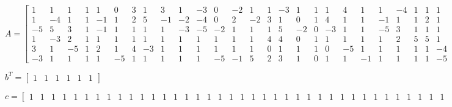 \documentclass[8pt]{article}
\begin{document}
\tiny
$ A =
\begin{bmatrix}
  1  &  1  &  1  &  1  &  1  &  0  &  3  &  1  &  3  &  1  & -3  &  0  & -2  &  1  &  1  & -3  &  1  &  1  &  1  &  4  &  1  &  1  & -4  &  1  &  1  &  1  & -2  &  4  &  1  &  4  & -5  & -3  & -2  &  1  &  1  &  1  &  1  &  1  &  1  &  1  &  1  & -4  &  1  &  1  & -1  &  1  &  1  & -5  &  1  & -3 \\
  1  & -4  &  1  &  1  & -1  &  1  &  2  &  5  & -1  & -2  & -4  &  0  &  2  & -2  &  3  &  1  &  0  &  1  &  4  &  1  &  1  & -1  &  1  &  1  &  2  &  1  &  1  & -5  &  1  &  2  &  1  & -2  &  2  &  1  &  1  &  3  & -2  &  1  &  1  & -3  &  1  & -3  &  1  &  1  & -2  &  1  &  1  &  4  &  1  &  1 \\
 -5  &  5  &  3  &  1  & -1  &  1  &  1  &  1  &  1  & -3  & -5  & -2  &  1  &  1  &  1  &  5  & -2  &  0  & -3  &  1  &  1  & -5  &  3  &  1  &  1  &  1  & -2  &  1  &  5  &  1  & -5  &  1  & -3  & -1  &  1  &  5  & -4  &  1  & -2  &  2  &  1  &  1  &  1  &  1  &  1  &  1  &  1  &  4  & -3  &  5 \\
  1  & -3  &  2  &  1  &  1  &  1  &  1  &  1  &  1  &  1  &  1  &  1  &  1  &  1  &  4  &  4  &  0  &  1  &  1  &  1  &  1  &  1  &  2  &  5  &  5  &  1  & -2  &  1  &  1  & -5  &  3  &  1  &  2  & -4  &  1  &  1  & -1  & -2  &  1  &  1  &  1  &  1  &  1  &  1  & -1  &  1  &  1  &  1  & -4  & -5 \\
  3  &  1  & -5  &  1  &  2  &  1  &  4  & -3  &  1  &  1  &  1  &  1  &  1  &  1  &  0  &  1  &  1  &  1  &  0  & -5  &  1  &  1  &  1  &  1  &  1  & -4  &  5  & -3  & -2  &  2  & -4  &  1  & -1  & -3  &  1  & -4  &  5  &  1  &  1  &  1  &  1  &  1  &  1  &  1  &  1  & -1  &  1  &  1  &  0  &  1 \\
 -3  &  1  &  1  &  1  &  1  & -5  &  1  &  1  &  1  &  1  &  1  & -5  & -1  &  5  &  2  &  3  &  1  &  0  &  1  &  1  & -1  &  1  &  1  &  1  &  1  & -5  & -4  & -2  &  1  & -2  & -5  &  0  & -5  & -3  & -5  &  1  &  2  &  1  &  0  & -4  &  1  &  3  & -2  & -5  &  5  &  1  &  1  & -4  &  1  &  1 
\end{bmatrix}
$


\tiny
$ b^T =
\begin{bmatrix}
  1  &  1  &  1  &  1  &  1  &  1 
\end{bmatrix}
$


\tiny
$ c =
\begin{bmatrix}
  1  &  1  &  1  &  1  &  1  &  1  &  1  &  1  &  1  &  1  &  1  &  1  &  1  &  1  &  1  &  1  &  1  &  1  &  1  &  1  &  1  &  1  &  1  &  1  &  1  &  1  &  1  &  1  &  1  &  1  &  1  &  1  &  1  &  1  &  1  &  1  &  1  &  1  &  1  &  1  &  1  &  1  &  1  &  1  &  1  &  1  &  1  &  1  &  1  &  1 
\end{bmatrix}
$
\end{document}
